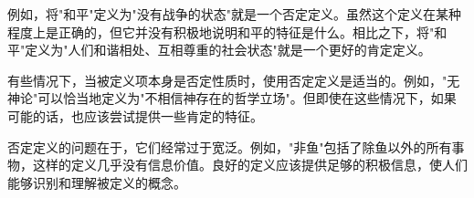 例如，将"和平"定义为"没有战争的状态"就是一个否定定义。虽然这个定义在某种程度上是正确的，但它并没有积极地说明和平的特征是什么。相比之下，将"和平"定义为"人们和谐相处、互相尊重的社会状态"就是一个更好的肯定定义。

有些情况下，当被定义项本身是否定性质时，使用否定定义是适当的。例如，"无神论"可以恰当地定义为"不相信神存在的哲学立场"。但即使在这些情况下，如果可能的话，也应该尝试提供一些肯定的特征。

否定定义的问题在于，它们经常过于宽泛。例如，"非鱼"包括了除鱼以外的所有事物，这样的定义几乎没有信息价值。良好的定义应该提供足够的积极信息，使人们能够识别和理解被定义的概念。

